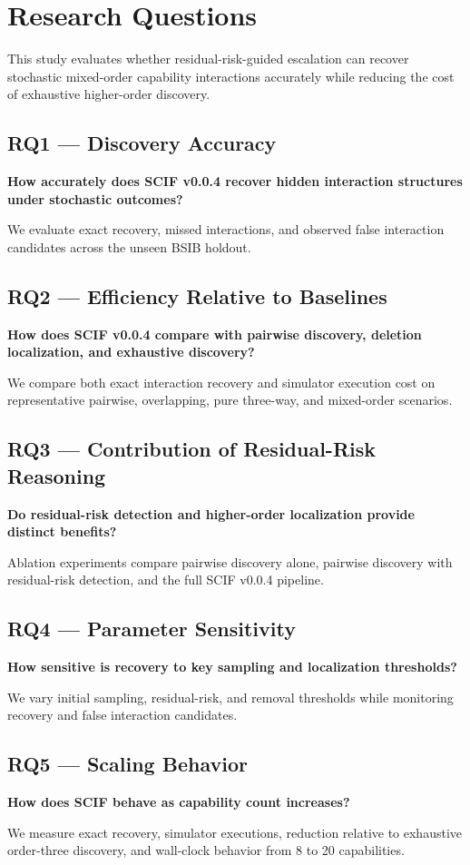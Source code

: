 \section{Research Questions}

This study evaluates whether residual-risk-guided escalation can recover stochastic mixed-order capability interactions accurately while reducing the cost of exhaustive higher-order discovery.

\subsection{RQ1 --- Discovery Accuracy}

\textbf{How accurately does SCIF v0.0.4 recover hidden interaction structures under stochastic outcomes?}

We evaluate exact recovery, missed interactions, and observed false interaction candidates across the unseen BSIB holdout.

\subsection{RQ2 --- Efficiency Relative to Baselines}

\textbf{How does SCIF v0.0.4 compare with pairwise discovery, deletion localization, and exhaustive discovery?}

We compare both exact interaction recovery and simulator execution cost on representative pairwise, overlapping, pure three-way, and mixed-order scenarios.

\subsection{RQ3 --- Contribution of Residual-Risk Reasoning}

\textbf{Do residual-risk detection and higher-order localization provide distinct benefits?}

Ablation experiments compare pairwise discovery alone, pairwise discovery with residual-risk detection, and the full SCIF v0.0.4 pipeline.

\subsection{RQ4 --- Parameter Sensitivity}

\textbf{How sensitive is recovery to key sampling and localization thresholds?}

We vary initial sampling, residual-risk, and removal thresholds while monitoring recovery and false interaction candidates.

\subsection{RQ5 --- Scaling Behavior}

\textbf{How does SCIF behave as capability count increases?}

We measure exact recovery, simulator executions, reduction relative to exhaustive order-three discovery, and wall-clock behavior from 8 to 20 capabilities.
